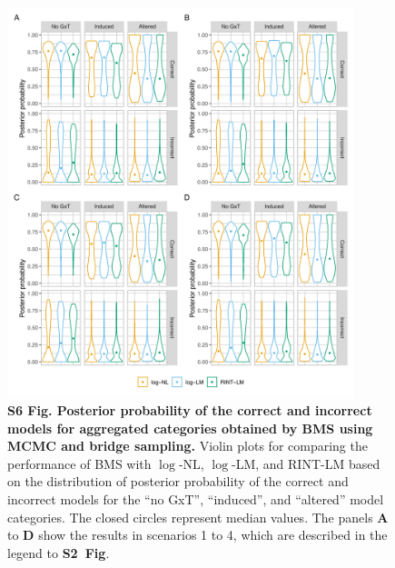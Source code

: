 \documentclass[11pt]{article}
\newcommand{\sfigroccmcmc}{\textbf{S2~Fig}\xspace}
\begin{document}
\begin{figure}[!ht]
\begin{center}
  \includegraphics[width=0.9\textwidth]{png/sim_vln_aggr_mcmc_bs.png}
\end{center}  
\caption{
  {\bf
    S6 Fig.
    Posterior probability of the correct and incorrect models for aggregated categories obtained by BMS using MCMC and bridge sampling.}
Violin plots for comparing the performance of BMS with $\log$-NL, $\log$-LM, and RINT-LM based on the distribution of posterior probability of the correct and incorrect models for the ``no GxT'', ``induced'', and ``altered'' model categories. The closed circles represent median values. The panels \textbf{A} to \textbf{D} show the results in scenarios 1 to 4, which are described in the legend to \sfigroccmcmc.
}
\label{s-fig:sim-vln-aggr-mcmc}
\end{figure}
\end{document}
